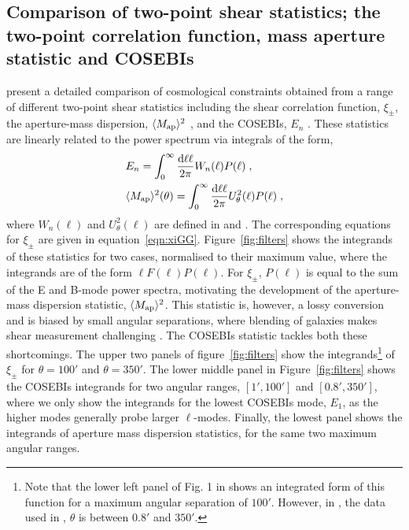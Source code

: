 \subsection{Comparison of two-point shear statistics; the two-point correlation function, mass aperture statistic and COSEBIs}


\citet{kilbinger/etal:2013} present a detailed comparison of cosmological constraints obtained from a range of different two-point shear statistics including the shear correlation function, $\xi_\pm$, the aperture-mass dispersion, $\langle M_ {\rm ap} \rangle ^2$ \citep{schneider/etal:1998}, and the COSEBIs, $E_n$ \citep{schneider/etal:2010}.  These statistics are linearly related to the power spectrum via integrals of the form,
%
\begin{align}
& E_n =\int_0^{\infty}\frac{{\rm d} \ell \ell}{2\pi} W_n(\ell) P(\ell)\;,\\ \nonumber
& \langle M_ {\rm ap} \rangle ^2(\theta)=\int_0^{\infty}\frac{{\rm d} \ell \ell}{2\pi} U^2_\theta(\ell) P(\ell)\;,
\end{align}
%
where $W_n(\ell)$ and $U^2_\theta(\ell)$ are defined in \cite{schneider/etal:2010} and \cite{schneider/etal:1998}. The corresponding equations for $\xi_\pm$ are given in equation~\ref{eqn:xiGG}.
Figure~\ref{fig:filters} shows the integrands of these statistics 
for two cases, normalised to their maximum value, where the integrands are of the form $\ell F(\ell) P(\ell)$. For $\xi_\pm$, $P(\ell)$ is equal to the sum of the E and B-mode power spectra, motivating the development of the aperture-mass dispersion statistic, $\langle M_ {\rm ap} \rangle ^2$.  This statistic is, however, a lossy conversion and is biased by small angular separations, where blending of galaxies makes shear measurement challenging \citep{kilbinger/etal:2006}.  The COSEBIs statistic tackles both these shortcomings.  The upper two panels of figure~\ref{fig:filters} show the integrands\footnote{Note that the lower left panel of Fig. 1 in \citet{kitching/etal:2016} shows an integrated form of this function for a maximum angular separation of $100'$. However, in \citet{kilbinger/etal:2013}, the data used in \citet{kitching/etal:2016}, $\theta$ is between $0.8'$ and $350'$.} of $\xi_\pm$ for $\theta=100'$ and $\theta=350'$. The lower middle panel in Figure~\ref{fig:filters} shows the COSEBIs integrands for two angular ranges, $[1',100']$ and $[0.8',350']$, where we only show the integrands for the lowest COSEBIs mode, $E_1$, as the higher modes generally probe larger $\ell$-modes.  Finally, the lowest panel shows the integrands of aperture mass dispersion statistics, for the same two maximum angular ranges. 

